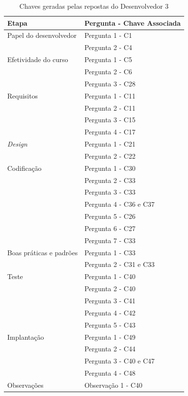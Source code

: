 \begin{table}[h]
	\centering
	\begin{tabular}{|m{4.8cm} | m{4.8cm} |}
		\hline
		\textbf{Etapa} & \textbf{Pergunta - Chave Associada} \\ \hline
		Papel do desenvolvedor & Pergunta 1 - C1 \\ \cline{2-2}
		& Pergunta 2 - C4 \\ \cline{2-2}
		\hline
		Efetividade do curso & Pergunta 1 - C5 \\ \cline{2-2}
		& Pergunta 2 - C6 \\ \cline{2-2}
		& Pergunta 3 - C28 \\ \cline{2-2}
		\hline
		Requisitos & Pergunta 1 - C11 \\ \cline{2-2}
		 & Pergunta 2 - C11 \\ \cline{2-2}
		& Pergunta 3 - C15 \\ \cline{2-2}
		& Pergunta 4 - C17 \\ \cline{2-2}
		\hline
		\textit{Design} & Pergunta 1 - C21 \\ \cline{2-2}
		& Pergunta 2 - C22 \\ \cline{2-2}
		\hline
		Codificação & Pergunta 1 - C30 \\ \cline{2-2}
		& Pergunta 2 - C33 \\ \cline{2-2}
		& Pergunta 3 - C33 \\ \cline{2-2}
		& Pergunta 4 - C36 e C37 \\ \cline{2-2}
		& Pergunta 5 - C26 \\ \cline{2-2}
		& Pergunta 6 - C27 \\ \cline{2-2}
		& Pergunta 7 - C33 \\ \cline{2-2} \hline
		Boas práticas e padrões & Pergunta 1 - C33 \\ \cline{2-2}
		& Pergunta 2 - C31 e C33 \\ \cline{2-2}
		\hline
		Teste & Pergunta 1 - C40 \\ \cline{2-2}
		& Pergunta 2 - C40 \\ \cline{2-2}
		& Pergunta 3 - C41 \\ \cline{2-2}
		& Pergunta 4 - C42 \\ \cline{2-2}
		& Pergunta 5 - C43 \\ \cline{2-2}
		\hline
		Implantação & Pergunta 1 - C49 \\ \cline{2-2}
		& Pergunta 2 - C44 \\ \cline{2-2}
		& Pergunta 3 - C40 e C47 \\ \cline{2-2}
		& Pergunta 4 - C48 \\ \cline{2-2}
		\hline
		Observações & Observação 1 - C40 \\ \hline
	\end{tabular}

	\caption{Chaves geradas pelas repostas do Desenvolvedor 3}
	\label{tab04}
\end{table}


